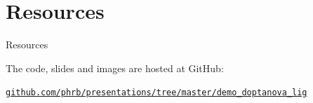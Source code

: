 \documentclass[10pt, compress, aspectratio=169, xcolor={table,usenames,dvipsnames}]{beamer}
\begin{document}
\section{Resources}
\label{sec:orge59c36b}
\begin{frame}[label={sec:org2e32775}]{Resources}
\begin{center}
The code, slides and images are \alert{hosted at GitHub}:

\href{https://github.com/phrb/presentations/tree/master/demo\_doptanova\_lig}{\texttt{github.com/phrb/presentations/tree/master/demo\_doptanova\_lig}}
\end{center}
\end{frame}
\maketitle
\end{document}
